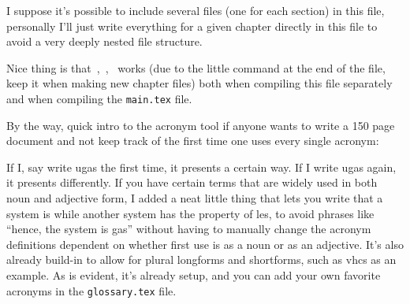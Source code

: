 \documentclass[../main.tex]{subfiles}
\begin{document}
I suppose it's possible to include several files (one for each section) in this file, personally I'll just write everything for a given chapter directly in this file to avoid a very deeply nested file structure.

Nice thing is that~\cite{khalilNonlinearSystems2002},~\cite{kelasidiModelingUnderwaterSnake2014},~\cite{liljebackControllabilityStabilityAnalysis2010} works (due to the little command at the end of the file, keep it when making new chapter files) both when compiling this file separately and when compiling the \texttt{main.tex} file.

By the way, quick intro to the acronym tool if anyone wants to write a 150 page document and not keep track of the first time one uses every single acronym:

If I, say write \gls{ugas} the first time, it presents a certain way. If I write \gls{ugas} again, it presents differently. If you have certain terms that are widely used in both noun and adjective form, I added a neat little thing that lets you write that a system is  while another system has the property of \gls{les}, to avoid phrases like ``hence, the system is \gls{gas}'' without having to manually change the acronym definitions dependent on whether first use is as a noun or as an adjective. It's also already build-in to allow for plural longforms and shortforms, such as \glspl{vhc} as an example. As is evident, it's already setup, and you can add your own favorite acronyms in the \texttt{glossary.tex} file.

\ifSubfilesClassLoaded{%
  
  
}{}
\end{document}
